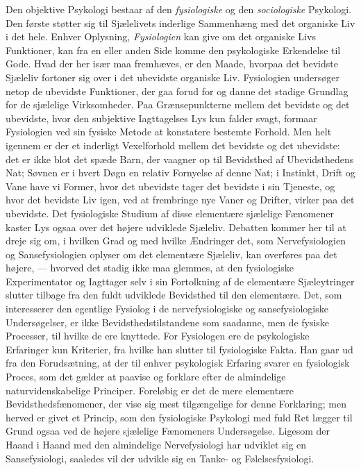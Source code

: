 \documentclass[12pt,a4paper,openany]{book}
\newcommand{\opage}[1]{\marginnote{\footnotesize\textit{[#1]}}}
\begin{document}
Den objektive Psykologi bestaar af den \emph{fysiologiske} og den
\emph{sociologiske} Psykologi. Den første støtter sig til Sjælelivets
inderlige Sammenhæng med det organiske Liv i det hele. Enhver Oplysning,
\emph{Fysiologien} kan give om det organiske Livs Funktioner, kan fra en
eller anden Side komme den psykologiske Erkendelse til Gode. Hvad der
her især maa fremhæves, er den Maade, hvorpaa det bevidste Sjæleliv
fortoner sig over i det ubevidste organiske Liv. Fysiologien undersøger
netop de ubevidste Funktioner, der gaa forud for og danne det stadige
Grundlag for de sjælelige Virksomheder. Paa Grænsepunkterne mellem det
bevidste og det ubevidste, hvor den subjektive Iagttagelses Lys kun
falder svagt, formaar Fysiologien ved sin fysiske Metode at konstatere
bestemte Forhold. Men helt igennem er der et inderligt Vexelforhold
mellem det bevidste og det ubevidste: det er ikke blot det spæde Barn,
der vaagner op til Bevidsthed af Ubevidsthedens Nat; Søvnen er i hvert
Døgn en relativ Fornyelse af denne Nat; i Instinkt, Drift og Vane have
vi Former, hvor det ubevidste tager det bevidste i sin Tjeneste, og hvor
det bevidste Liv igen, ved at frembringe nye Vaner og Drifter, virker
paa det ubevidste. Det fysiologiske Studium af disse elementære
sjælelige Fænomener kaster Lys ogsaa over det højere udviklede Sjæleliv.
Debatten kommer her til at dreje sig om, i hvilken Grad og med hvilke
Ændringer det, som Nervefysiologien og Sansefysiologien oplyser om det
elementære Sjæleliv, kan overføres paa det højere, --- hvorved det
stadig ikke maa glemmes, at den fysiologiske Experimentator og Iagttager
selv i sin Fortolkning af de elementære Sjæleytringer slutter tilbage
fra den fuldt udviklede Bevidsthed til den elementære. Det, som
interesserer den egentlige Fysiolog i de nervefysiologiske og
sansefysiologiske Undersøgelser, er ikke Bevidsthedstilstandene som
saadanne, men de fysiske Processer, til hvilke de ere knyttede. For
Fysiologen ere de psykologiske Erfaringer kun Kriterier, fra hvilke han
slutter til fysiologiske Fakta. Han gaar ud fra den Forudsætning, at der
til enhver psykologisk Erfaring svarer en fysiologisk Proces, som det
gælder at
\opage{31}paavise og forklare efter de almindelige naturvidenskabelige
Principer. Foreløbig er det de mere elementære Bevidsthedsfænomener, der
vise sig mest tilgængelige for denne Forklaring; men herved er givet et
Princip, som den fysiologiske Psykologi med fuld Ret lægger til Grund
ogsaa ved de højere sjælelige Fænomeners Undersøgelse. Ligesom der Haand
i Haand med den almindelige Nervefysiologi har udviklet sig en
Sansefysiologi, saaledes vil der udvikle sig en Tanke- og
Følelsesfysiologi.
\end{document}
